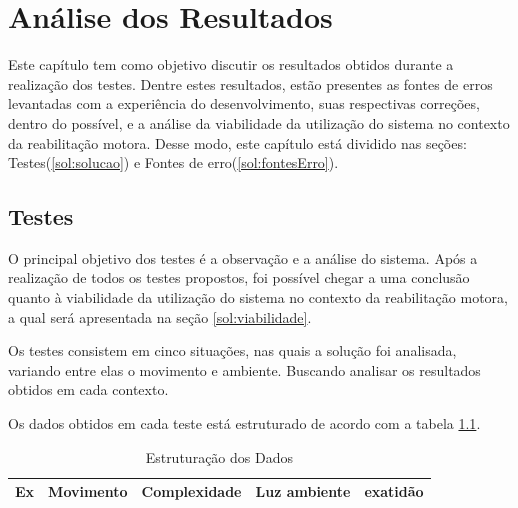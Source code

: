 \chapter[Análise dos Resultados]{Análise dos Resultados}\label{ch:analiseResultados}
  Este capítulo tem como objetivo discutir  os resultados obtidos durante a realização dos testes. Dentre estes
resultados, estão presentes as fontes de erros levantadas com a experiência do desenvolvimento,
suas respectivas correções, dentro do possível, e a análise da viabilidade da utilização do
sistema no contexto da reabilitação motora. Desse modo, este
capítulo está dividido nas seções: Testes(\ref{sol:solucao}) e Fontes de erro(\ref{sol:fontesErro}).

\section{Testes}\label{sec:testes}
  O principal objetivo dos testes é a observação e a análise do sistema. Após a realização de todos os testes propostos, foi possível chegar a
uma conclusão quanto à viabilidade da utilização do sistema no contexto da reabilitação motora,
 a qual será apresentada na seção \ref{sol:viabilidade}.

 Os testes consistem em cinco situações, nas quais a solução foi analisada,
variando entre elas o movimento e ambiente. Buscando analisar os resultados obtidos em cada contexto.

  Os dados obtidos em cada teste está estruturado de acordo com a tabela \ref{tab:analise}.

  \begin{table}[H]
  \centering
  \caption{Estruturação dos Dados}
  \label{tab:analise}
  \begin{tabular}{@{}|l|l|l|l|l|@{}}
  \toprule
  \textbf{Ex} &\textbf{Movimento} & \textbf{Complexidade} & \textbf{Luz ambiente} & \textbf{exatidão} \\ \bottomrule
  \end{tabular}
  \end{table}

